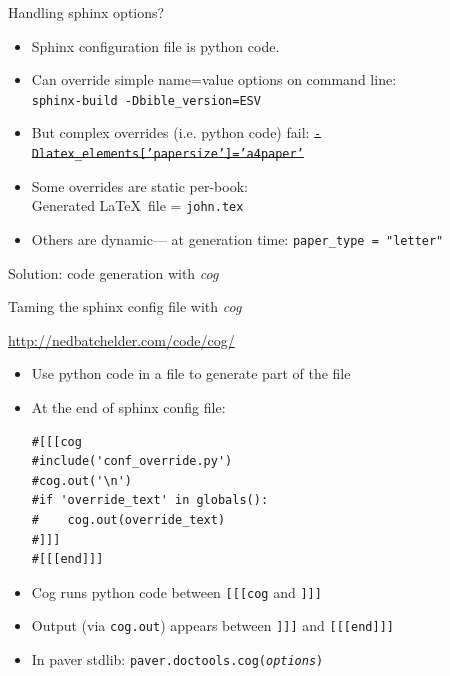 \documentclass{beamer}
\begin{document}
\begin{frame}[fragile]{Handling sphinx options?}

\begin{itemize}
\item Sphinx configuration file is python code.

\item Can override simple name=value options on command line:\\
\texttt{sphinx-build -Dbible\_version=ESV}

\item But complex overrides (i.e. python code) fail:
\sout{\texttt{-Dlatex\_elements['papersize']='a4paper'}}

\item Some overrides are static per-book:\\
Generated \LaTeX\ file = \texttt{john.tex}

\item Others are dynamic--- at generation time:
\texttt{paper\_type = "letter"}
\end{itemize}

Solution: code generation with \emph{cog}
\end{frame}

\begin{frame}[fragile]{Taming the sphinx config file with \emph{cog}}

\url{http://nedbatchelder.com/code/cog/}

\begin{itemize}
\item Use python code in a file to generate part of the file

\item At the end of sphinx config file:
\begin{verbatim}
#[[[cog 
#include('conf_override.py')
#cog.out('\n')
#if 'override_text' in globals():
#    cog.out(override_text)
#]]]
#[[[end]]]
\end{verbatim}

\item Cog runs python code between \texttt{[[[cog} and \texttt{]]]}

\item Output (via \texttt{cog.out}) appears between \texttt{]]]} and \texttt{[[[end]]]}

\item In paver stdlib: \texttt{paver.doctools.cog(\emph{options})}
\end{itemize}
\end{frame}
\end{document}
